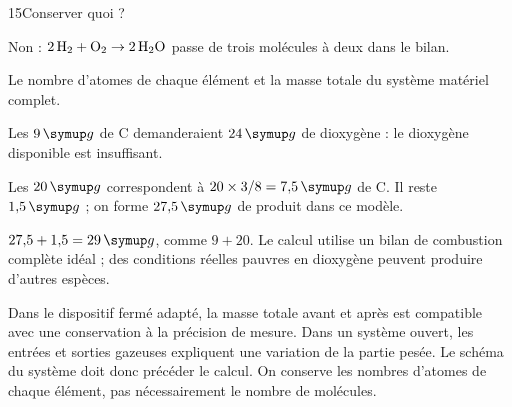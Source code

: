 \par\noindent\begin{minipage}{\linewidth}
\begin{corrige}{15}{Conserver quoi ?}
\begin{questions}
\item Non : $2\,\ce{H2}+\ce{O2}\rightarrow2\,\ce{H2O}$ passe de trois molécules à deux dans le bilan.
\item Le nombre d’atomes de chaque élément et la masse totale du système matériel complet.
\end{questions}
\end{corrige}
\end{minipage}
\par\noindent\begin{minipage}{\linewidth}
\label{cor-defi-6}\begin{questions}
\item Les $9\unite g$ de C demanderaient $24\unite g$ de dioxygène : le dioxygène disponible est insuffisant.
\item Les $20\unite g$ correspondent à $20\times3/8=7{,}5\unite g$ de C. Il reste $1{,}5\unite g$ ; on forme $27{,}5\unite g$ de produit dans ce modèle.
\item $27{,}5+1{,}5=29\unite g$, comme $9+20$. Le calcul utilise un bilan de combustion complète idéal ; des conditions réelles pauvres en dioxygène peuvent produire d’autres espèces.
\end{questions}
\end{minipage}
\par\noindent\begin{minipage}{\linewidth}
\label{cor-activite-6}
Dans le dispositif fermé adapté, la masse totale avant et après est compatible avec une conservation à la précision de mesure. Dans un système ouvert, les entrées et sorties gazeuses expliquent une variation de la partie pesée. Le schéma du système doit donc précéder le calcul. On conserve les nombres d’atomes de chaque élément, pas nécessairement le nombre de molécules.\par\end{minipage}
